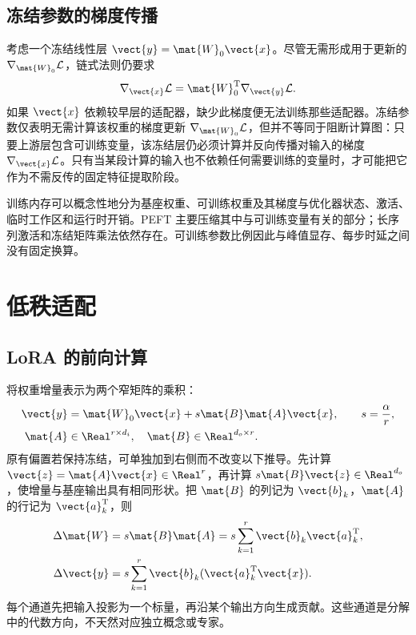 \documentclass[../textbook.tex]{subfiles}
\begin{document}
\subsection{冻结参数的梯度传播}
考虑一个冻结线性层 $\vect{y}=\mat{W}_0\vect{x}$。尽管无需形成用于更新的 $\nabla_{\mat{W}_0}\mathcal L$，链式法则仍要求
\begin{equation}
\nabla_{\vect{x}}\mathcal L=\mat{W}_0^{\mathrm{T}}\nabla_{\vect{y}}\mathcal L.
\label{eq:peft-frozen}
\end{equation}
如果 $\vect{x}$ 依赖较早层的适配器，缺少此梯度便无法训练那些适配器。冻结参数仅表明无需计算该权重的梯度更新 $\nabla_{\mat{W}_0}\mathcal L$，但并不等同于阻断计算图：只要上游层包含可训练变量，该冻结层仍必须计算并反向传播对输入的梯度 $\nabla_{\vect{x}}\mathcal L$。只有当某段计算的输入也不依赖任何需要训练的变量时，才可能把它作为不需反传的固定特征提取阶段。

训练内存可以概念性地分为基座权重、可训练权重及其梯度与优化器状态、激活、临时工作区和运行时开销。PEFT 主要压缩其中与可训练变量有关的部分；长序列激活和冻结矩阵乘法依然存在。可训练参数比例因此与峰值显存、每步时延之间没有固定换算。

\section{低秩适配}

\subsection{LoRA 的前向计算}
将权重增量表示为两个窄矩阵的乘积\cite{huLoRALowRankAdaptation2022}：
\begin{equation}\label{eq:peft-lora}
 \begin{aligned}
  \vect{y} &= \mat{W}_0\vect{x}+s\mat{B}\mat{A}\vect{x}, \qquad s=\frac{\alpha}{r}, \\
  \mat{A} &\in\Real^{r\times d_i},\quad \mat{B}\in\Real^{d_o\times r}.
 \end{aligned}
\end{equation}
原有偏置若保持冻结，可单独加到右侧而不改变以下推导。先计算 $\vect{z}=\mat{A}\vect{x}\in\Real^r$，再计算 $s\mat{B}\vect{z}\in\Real^{d_o}$，使增量与基座输出具有相同形状。把 $\mat{B}$ 的列记为 $\vect{b}_k$，$\mat{A}$ 的行记为 $\vect{a}_k^{\mathrm{T}}$，则
\begin{equation}
 \begin{aligned}
  \Delta \mat{W} &= s\mat{B}\mat{A}=s\sum_{k=1}^{r}\vect{b}_k\vect{a}_k^{\mathrm{T}}, \\
  \Delta \vect{y} &= s\sum_{k=1}^{r}\vect{b}_k(\vect{a}_k^{\mathrm{T}}\vect{x}).
 \end{aligned}
\end{equation}
每个通道先把输入投影为一个标量，再沿某个输出方向生成贡献。这些通道是分解中的代数方向，不天然对应独立概念或专家。
\end{document}
